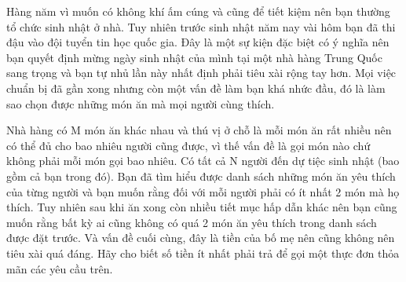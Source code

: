 Hàng năm vì muốn có không khí ấm cúng và cũng để tiết kiệm nên bạn thường tổ chức sinh nhật ở nhà. Tuy nhiên trước sinh nhật năm nay vài hôm bạn đã thi đậu vào đội tuyển tin học quốc gia. Đây là một sự kiện đặc biệt có ý nghĩa nên bạn quyết định mừng ngày sinh nhật của mình tại một nhà hàng Trung Quốc sang trọng và bạn tự nhủ lần này nhất định phải tiêu xài rộng tay hơn. Mọi việc chuẩn bị đã gần xong nhưng còn một vấn đề làm bạn khá nhức đầu, đó là làm sao chọn được những món ăn mà mọi người cùng thích.  

   Nhà hàng có M món ăn khác nhau và thú vị ở chỗ là mỗi món ăn rất nhiều nên có thể đủ cho bao nhiêu người cũng được, vì thế vấn đề là gọi món nào chứ không phải mỗi món gọi bao nhiêu. Có tất cả N người đến dự tiệc sinh nhật (bao gồm cả bạn trong đó). Bạn đã tìm hiểu được danh sách những món ăn yêu thích của từng người và bạn muốn rằng đối với mỗi người phải có ít nhất 2 món mà họ thích. Tuy nhiên sau khi ăn xong còn nhiều tiết mục hấp dẫn khác nên bạn cũng muốn rằng bất kỳ ai cũng không có quá 2 món ăn yêu thích trong danh sách được đặt trước. Và vấn đề cuối cùng, đây là tiền của bố mẹ nên cũng không nên tiêu xài quá đáng.
Hãy cho biết số tiền ít nhất phải trả để gọi một thực đơn thỏa mãn các yêu cầu trên.